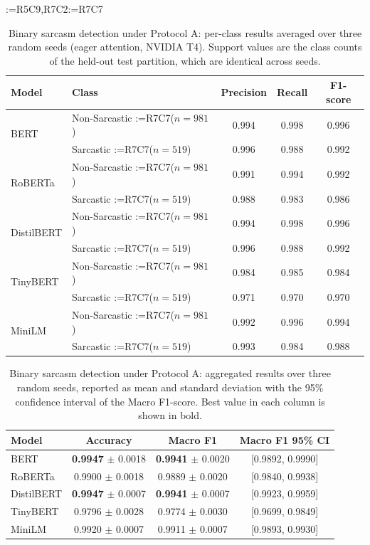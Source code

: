 \documentclass[a4paper,fleqn]{cas-sc}
\makeatletter
\newif\iftracked
\newcommand{\rv@setcolour}[1]{%
  \IfStrEq{#1}{R7C7}{\color{rvEdit}}{%
    \IfSubStr{#1}{R5}{\IfSubStr{#1}{R7}{\color{rvBoth}}{\color{rvFive}}}{\color{rvSeven}}}}
\newcommand{\rv@tag}[1]{\textsuperscript{\sffamily\bfseries\scriptsize[\StrSubstitute{#1}{,}{, }]}\,}
\newcommand{\rv@recordone}[1]{%
  \edef\rv@i{#1}%
  \ifcsdef{rv@n@\rv@i}{}{\csgdef{rv@n@\rv@i}{0}}%
  \csxdef{rv@n@\rv@i}{\the\numexpr\csuse{rv@n@\rv@i}+1\relax}%
  \begingroup\edef\@currentlabel{\rv@i}\label{rv:\rv@i:\csuse{rv@n@\rv@i}}\endgroup}
\newcommand{\rv@record}[1]{\@for\rv@id:=#1\do{\expandafter\rv@recordone\expandafter{\rv@id}}}
\DeclareRobustCommand{\rcx}[2]{\iftracked{\rv@setcolour{#1}\rv@tag{#1}#2}\else#2\fi}
\DeclareRobustCommand{\rcmark}[1]{\rv@record{#1}}
\DeclareRobustCommand{\rce}[1]{\rv@record{R7C7}\iftracked{\color{rvEdit}#1}\else#1\fi}
\makeatother
\begin{document}
\begin{table}[t]
\caption{Binary sarcasm detection\rcx{R5C9,R7C2}{ under Protocol A}: per-class results averaged over three random seeds (\rcx{R7C7}{eager} attention, NVIDIA T4). Support values are the \rcx{R7C7}{class counts of the held-out test partition, which are identical across seeds}.}
\rcmark{R5C9,R7C2}\rcmark{R7C7}
\label{tab:bin-perclass}
\centering\small
\begin{tabular}{llccc}
\toprule
Model & Class & Precision & Recall & F1-score \\
\midrule
\multirow{2}{*}{BERT} & Non-Sarcastic \rce{($n=981$)} & 0.994 & 0.998 & 0.996 \\
 & Sarcastic \rce{($n=519$)} & 0.996 & 0.988 & 0.992 \\
\midrule
\multirow{2}{*}{RoBERTa} & Non-Sarcastic \rce{($n=981$)} & 0.991 & 0.994 & 0.992 \\
 & Sarcastic \rce{($n=519$)} & 0.988 & 0.983 & 0.986 \\
\midrule
\multirow{2}{*}{DistilBERT} & Non-Sarcastic \rce{($n=981$)} & 0.994 & 0.998 & 0.996 \\
 & Sarcastic \rce{($n=519$)} & 0.996 & 0.988 & 0.992 \\
\midrule
\multirow{2}{*}{TinyBERT} & Non-Sarcastic \rce{($n=981$)} & 0.984 & 0.985 & 0.984 \\
 & Sarcastic \rce{($n=519$)} & 0.971 & 0.970 & 0.970 \\
\midrule
\multirow{2}{*}{MiniLM} & Non-Sarcastic \rce{($n=981$)} & 0.992 & 0.996 & 0.994 \\
 & Sarcastic \rce{($n=519$)} & 0.993 & 0.984 & 0.988 \\
\bottomrule
\end{tabular}
\end{table}

\begin{table}[t]
\caption{Binary sarcasm detection\rcx{R5C9,R7C2}{ under Protocol A}: aggregated results over three random seeds, reported as mean and standard deviation with the 95\% confidence interval of the Macro F1-score. Best value in each column is shown in bold.}
\label{tab:bin-agg}
\centering\small
\begin{tabular}{lccc}
\toprule
Model & Accuracy & Macro F1 & Macro F1 95\% CI \\
\midrule
BERT & \textbf{0.9947} $\pm$ 0.0018 & \textbf{0.9941} $\pm$ 0.0020 & [0.9892, 0.9990] \\
RoBERTa & 0.9900 $\pm$ 0.0018 & 0.9889 $\pm$ 0.0020 & [0.9840, 0.9938] \\
DistilBERT & \textbf{0.9947} $\pm$ 0.0007 & \textbf{0.9941} $\pm$ 0.0007 & [0.9923, 0.9959] \\
TinyBERT & 0.9796 $\pm$ 0.0028 & 0.9774 $\pm$ 0.0030 & [0.9699, 0.9849] \\
MiniLM & 0.9920 $\pm$ 0.0007 & 0.9911 $\pm$ 0.0007 & [0.9893, 0.9930] \\
\bottomrule
\end{tabular}
\end{table}
\end{document}
